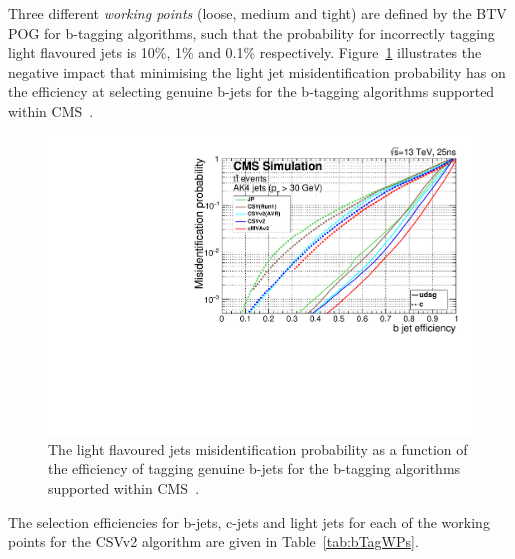 Three different \emph{working points} (loose, medium and tight) are defined by the BTV POG for b-tagging algorithms, such that the probability for incorrectly tagging light flavoured jets is 10\%, 1\% and 0.1\% respectively.
Figure~\ref{fig:bTagEffVsMisId} illustrates the negative impact that minimising the light jet misidentification probability has on the efficiency at selecting genuine b-jets for the b-tagging algorithms supported within CMS~\cite{Sirunyan:2017ezt}.

\begin{figure}[htbp]
\centering
\includegraphics[width=\textwidth]{figs/data-mc/effVsMisTagcsvV2.pdf}
\caption{The light flavoured jets misidentification probability as a function of the efficiency of tagging genuine b-jets for the b-tagging algorithms supported within CMS~\cite{Sirunyan:2017ezt}.}
\label{fig:bTagEffVsMisId}
\end{figure}

The selection efficiencies for b-jets, c-jets and light jets for each of the working points for the CSVv2 algorithm are given in Table~\ref{tab:bTagWPs}.

